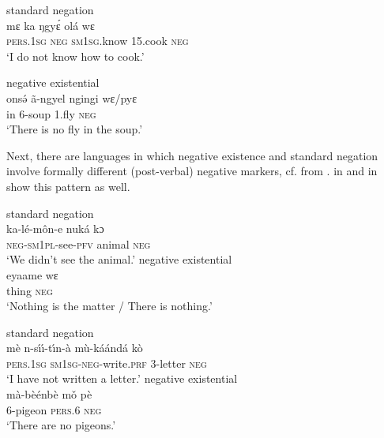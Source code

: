 \documentclass[output=paper,draft,draftmode,colorlinks,citecolor=brown]{langscibook}
\begin{document}
%

\ea\label{ex:engungwel-cook-fly}
%

\ea standard negation\\
\gll mɛ ka ŋgy\'ɛ ol\'a wɛ\\
	\textsc{pers.1sg} \textsc{neg} \textsc{sm1sg}.know 15.cook \textsc{neg}\\
\glt 	`I do not know how to cook.'
%

\newpage
\ex negative existential\\
\gll ons\'ə {\~a}-ngyel ngingi wɛ/pyɛ\footnotemark\\
	in 6-soup 1.fly \textsc{neg}\\
\glt 	`There is no fly in the soup.'
\z
\z

%
Next, there are languages in which negative existence and standard negation involve formally different (post-verbal) negative markers, cf.  from .  in  and  in  show this pattern as well.

\ea\label{ex:tiene-animal-nothing}
%

\ea standard negation\\
\gll ka-l{é}-m{\^o}n-e nuk\'a kɔ\\
	\textsc{neg-sm1pl}-see-\textsc{pfv} animal \textsc{neg}\\
\glt `We didn’t see the animal.'
%
\ex negative existential\\
\gll eyaame wɛ\\
	thing \textsc{neg}\\
\glt 	`Nothing is the matter / There is nothing.'
\z
\z

%

\ea\label{ex:beembe-letter-pigeon}
%

\ea standard negation\\
\gll m\`e n-s\'\i\'\i-t{\'\i}n-\`a m\`u-k{\'a\'a}nd\'a k\`o\\
	\textsc{pers.1sg}  \textsc{sm1sg-neg}{}-write.\textsc{prf}    3-letter      \textsc{neg}\\
\glt 	`I have not written a letter.'
%
\ex negative existential\\
\gll m{\`a}-b{\`eé}nb\`e mǒ p\`e\\
	6-pigeon \textsc{pers}.6 \textsc{neg}\\
\glt 	`There are no pigeons.'
\z
\z
\end{document}
